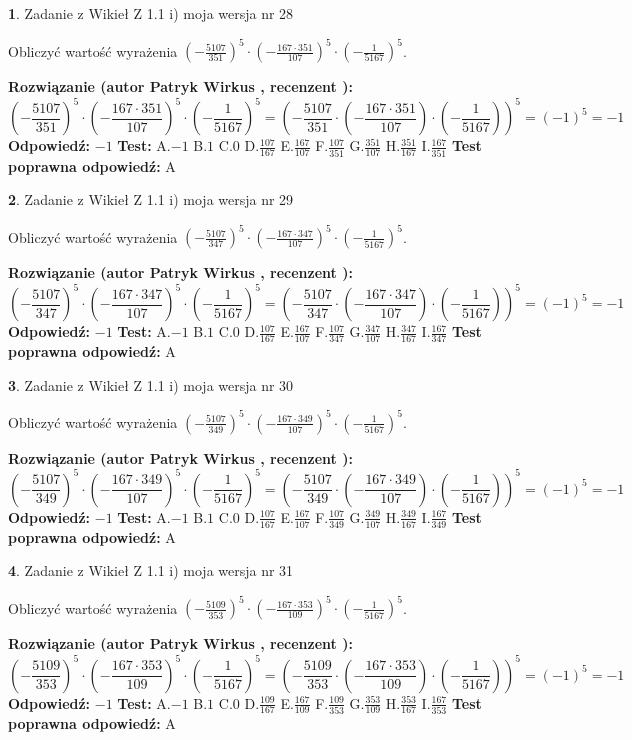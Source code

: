 \documentclass[12pt, a4paper]{article}
\theoremstyle{definition} %
\newtheorem{zad}{}
\newcommand{\zadStart}[1]{\begin{zad}#1\newline}
\newcommand{\zadStop}{\end{zad}}
\newcommand{\rozwStart}[2]{\noindent \textbf{Rozwiązanie (autor #1 , recenzent #2): }\newline}
\newcommand{\rozwStop}{\newline}
\newcommand{\odpStart}{\noindent \textbf{Odpowiedź:}\newline}
\newcommand{\odpStop}{\newline}
\newcommand{\testStart}{\noindent \textbf{Test:}\newline}
\newcommand{\testStop}{\newline}
\newcommand{\kluczStart}{\noindent \textbf{Test poprawna odpowiedź:}\newline}
\newcommand{\kluczStop}{\newline}
\begin{document}
\zadStart{Zadanie z Wikieł Z 1.1 i) moja wersja nr 28}

Obliczyć wartość wyrażenia $(-\frac{5107}{351})^{5} \cdot (-\frac{167 \cdot 351}{107})^{5} \cdot (-\frac{1}{5167})^{5}$.
\zadStop
\rozwStart{Patryk Wirkus}{}
$$(-\frac{5107}{351})^{5} \cdot (-\frac{167 \cdot 351}{107})^{5} \cdot (-\frac{1}{5167})^{5} = (-\frac{5107}{351} \cdot (-\frac{167 \cdot 351}{107}) \cdot (-\frac{1}{5167}))^{5} = (-1)^{5} = -1$$
\rozwStop
\odpStart
$-1$
\odpStop
\testStart
A.$-1$ B.$1$ C.$0$ D.$\frac{107}{167}$ E.$\frac{167}{107}$
F.$\frac{107}{351}$ G.$\frac{351}{107}$
H.$\frac{351}{167}$
I.$\frac{167}{351}$
\testStop
\kluczStart
A
\kluczStop



\zadStart{Zadanie z Wikieł Z 1.1 i) moja wersja nr 29}

Obliczyć wartość wyrażenia $(-\frac{5107}{347})^{5} \cdot (-\frac{167 \cdot 347}{107})^{5} \cdot (-\frac{1}{5167})^{5}$.
\zadStop
\rozwStart{Patryk Wirkus}{}
$$(-\frac{5107}{347})^{5} \cdot (-\frac{167 \cdot 347}{107})^{5} \cdot (-\frac{1}{5167})^{5} = (-\frac{5107}{347} \cdot (-\frac{167 \cdot 347}{107}) \cdot (-\frac{1}{5167}))^{5} = (-1)^{5} = -1$$
\rozwStop
\odpStart
$-1$
\odpStop
\testStart
A.$-1$ B.$1$ C.$0$ D.$\frac{107}{167}$ E.$\frac{167}{107}$
F.$\frac{107}{347}$ G.$\frac{347}{107}$
H.$\frac{347}{167}$
I.$\frac{167}{347}$
\testStop
\kluczStart
A
\kluczStop



\zadStart{Zadanie z Wikieł Z 1.1 i) moja wersja nr 30}

Obliczyć wartość wyrażenia $(-\frac{5107}{349})^{5} \cdot (-\frac{167 \cdot 349}{107})^{5} \cdot (-\frac{1}{5167})^{5}$.
\zadStop
\rozwStart{Patryk Wirkus}{}
$$(-\frac{5107}{349})^{5} \cdot (-\frac{167 \cdot 349}{107})^{5} \cdot (-\frac{1}{5167})^{5} = (-\frac{5107}{349} \cdot (-\frac{167 \cdot 349}{107}) \cdot (-\frac{1}{5167}))^{5} = (-1)^{5} = -1$$
\rozwStop
\odpStart
$-1$
\odpStop
\testStart
A.$-1$ B.$1$ C.$0$ D.$\frac{107}{167}$ E.$\frac{167}{107}$
F.$\frac{107}{349}$ G.$\frac{349}{107}$
H.$\frac{349}{167}$
I.$\frac{167}{349}$
\testStop
\kluczStart
A
\kluczStop



\zadStart{Zadanie z Wikieł Z 1.1 i) moja wersja nr 31}

Obliczyć wartość wyrażenia $(-\frac{5109}{353})^{5} \cdot (-\frac{167 \cdot 353}{109})^{5} \cdot (-\frac{1}{5167})^{5}$.
\zadStop
\rozwStart{Patryk Wirkus}{}
$$(-\frac{5109}{353})^{5} \cdot (-\frac{167 \cdot 353}{109})^{5} \cdot (-\frac{1}{5167})^{5} = (-\frac{5109}{353} \cdot (-\frac{167 \cdot 353}{109}) \cdot (-\frac{1}{5167}))^{5} = (-1)^{5} = -1$$
\rozwStop
\odpStart
$-1$
\odpStop
\testStart
A.$-1$ B.$1$ C.$0$ D.$\frac{109}{167}$ E.$\frac{167}{109}$
F.$\frac{109}{353}$ G.$\frac{353}{109}$
H.$\frac{353}{167}$
I.$\frac{167}{353}$
\testStop
\kluczStart
A
\kluczStop
\end{document}
